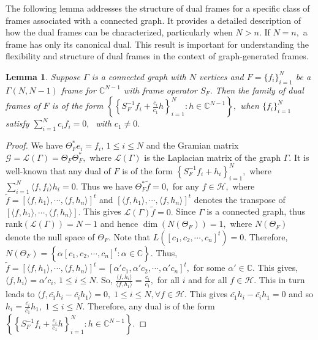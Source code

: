 \documentclass[final,1p,times]{elsarticle}
\newtheorem{lem}[thm]{Lemma}
\begin{document}
The following lemma addresses the structure of dual frames for a specific class of frames associated with a connected graph. It provides a detailed description of how the dual frames can be characterized, particularly when $N>n.$ If $N=n,$ a frame has only its canonical dual. This result is important for understanding the flexibility and structure of dual frames in the context of graph-generated frames.

\begin{lem}
	Suppose $\Gamma$ is a connected graph with $N$ vertices and $F= \{f_i\}_{i=1}^N$ be a $\Gamma(N, N-1)$ frame for $\mathbb{C}^{N-1}$ with frame operator $S_F.$ Then the family of dual frames of $F$ is of the form $\left\{\left\{ S_{F}^{-1}f_i + \frac{c_i}{c_1}h  \right\}_{i=1}^N : h \in \mathbb{C}^{N-1}\right\},$ when $ \{f_i\}_{i=1}^N$ satisfy $\sum\limits_{i=1}^N c_i f_i = 0,\;$ with $c_1 \neq 0.$
\end{lem}

\begin{proof}
	We have $\Theta_F^{*}e_i = f_i,\,1 \leq i \leq N$ and the Gramian matrix $\mathcal{G} = \mathcal{L}(\Gamma) = \Theta_F \Theta_F^{*},$ where $\mathcal{L}(\Gamma)$ is the Laplacian matrix of the graph $\Gamma.$ It is well-known that any dual of $F$ is of the form $\left\{ S_{F}^{-1}f_i + h_i  \right\}_{i=1}^N, $ where $\sum\limits_{i=1}^N \langle f, f_i \rangle h_i = 0.$   Thus we have $\Theta_F^{*}\tilde{f} = 0,$ for any $f \in \mathcal{H},$ where $\tilde{f} = [\langle f,h_1 \rangle, \cdots , \langle f,h_n \rangle ]^{t}$ and $[\langle f,h_1 \rangle, \cdots , \langle f,h_n \rangle ]^{t}$ denotes the transpose of $[\langle f,h_1 \rangle, \cdots , \langle f,h_n \rangle ].$ This gives $\mathcal{L}(\Gamma) \tilde{f} = 0.$ Since $\Gamma$ is a connected graph, thus rank$\left(\mathcal{L}(\Gamma)\right) = N-1 $ and hence $\dim\left(N(\Theta_F) \right) = 1,$ where $N(\Theta_F)$ denote the null space of $\Theta_F.$ Note that $L\left( [c_1,c_2, \cdots, c_n]^{t}  \right) = 0.$ Therefore, $N(\Theta_F) = \left\{\alpha [c_1, c_2, \cdots, c_n]^{t} : \alpha \in \mathbb{C}\right\}.$ Thus, $\tilde{f} = [\langle f,h_1 \rangle, \cdots , \langle f,h_n \rangle ]^{t} = [\alpha'c_1, \alpha'c_2, \cdots, \alpha'c_n]^{t},$ for some $\alpha' \in \mathbb{C}.$  This gives, $\langle f,h_i \rangle = \alpha'c_i,\,1 \leq i \leq N.$ So, $\frac{\langle f,h_i \rangle}{\langle f,h_1 \rangle} = \frac{c_i}{c_1},$ for all $i$ and  for all $f \in \mathcal{H}.$ This in turn leads to $\langle f, \bar{c_1}h_i - \bar{c_i}h_1 \rangle = 0,\;1 \leq i \leq N, \forall f \in \mathcal{H}.$ This gives $\bar{c_1}h_i - \bar{c_i}h_1 = 0$ and so $h_i = \frac{\bar{c_i}}{\bar{c_1}}h_1,\;1 \leq i \leq N.$ Therefore, any dual is of the form  $\left\{\left\{ S_{F}^{-1}f_i + \frac{c_i}{c_1}h  \right\}_{i=1}^N : h \in \mathbb{C}^{N-1}\right\}.$
\end{proof}
\end{document}
